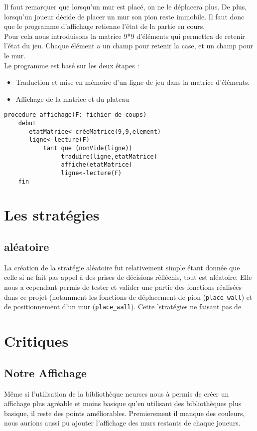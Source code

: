 \documentclass[a4paper, draft]{article}
\begin{document}
Il faut remarquer que lorsqu'un mur est placé, on ne le déplacera plus. De plus, lorsqu'un joueur décide de placer un mur son pion reste immobile. Il faut donc que le programme d'affichage retienne l'état de la partie en cours.
\\Pour cela nous introduisons la matrice 9*9 d'éléments qui permettra de retenir l'état du jeu. Chaque élément a un champ pour retenir la case,  et un champ pour le mur.
\\ Le programme est basé sur les deux étapes :
\begin{itemize}

  \item Traduction et mise en mémoire d'un ligne de jeu dans la matrice d'éléments.
  \item Affichage de la matrice et du plateau

\end{itemize}

\begin{center}
\begin{verbatim}
procedure affichage(F: fichier_de_coups)
    debut
       etatMatrice<-créeMatrice(9,9,element)
       ligne<-lecture(F)
           tant que (nonVide(ligne))
                traduire(ligne,etatMatrice)
                affiche(etatMatrice)
                ligne<-lecture(F)   
    fin
\end{verbatim}
\end{center}


\section{Les stratégies}
\subsection{aléatoire}

La création de la stratégie aléatoire fut relativement simple étant donnée que celle si ne fait pas appel à des prises de décisions réfléchis, tout est aléatoire. Elle nous a cependant
permis de tester et valider une partie des fonctions réalisées dans ce projet (notamment les fonctions de déplacement de pion (\verb?place_wall?) et de positionnement d'un mur (\verb?place_wall?).
Cette 'stratégies ne faisant pas de

\section{Critiques}
\subsection{Notre Affichage}
Même si l'utilisation de la bibliothèque ncurses nous à permis de créer un affichage plus agréable et moins basique qu'en utilisant des bibliothèques plus basique,
il reste des points améliorables. Premierement il manque des couleurs, nous aurions aussi pu ajouter l'affichage des murs restants de chaque joueurs.
\end{document}
